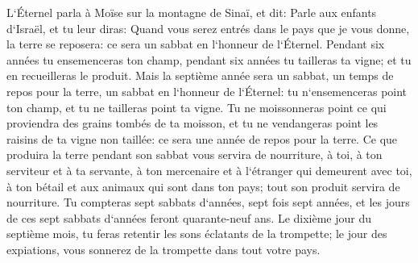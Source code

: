 \verse L`Éternel parla à Moïse sur la montagne de Sinaï, et dit: 
\verse Parle aux enfants d`Israël, et tu leur diras: Quand vous serez entrés dans le pays que je vous donne, la terre se reposera: ce sera un sabbat en l`honneur de l`Éternel. 
\verse Pendant six années tu ensemenceras ton champ, pendant six années tu tailleras ta vigne; et tu en recueilleras le produit. 
\verse Mais la septième année sera un sabbat, un temps de repos pour la terre, un sabbat en l`honneur de l`Éternel: tu n`ensemenceras point ton champ, et tu ne tailleras point ta vigne. 
\verse Tu ne moissonneras point ce qui proviendra des grains tombés de ta moisson, et tu ne vendangeras point les raisins de ta vigne non taillée: ce sera une année de repos pour la terre. 
\verse Ce que produira la terre pendant son sabbat vous servira de nourriture, à toi, à ton serviteur et à ta servante, à ton mercenaire et à l`étranger qui demeurent avec toi, 
\verse à ton bétail et aux animaux qui sont dans ton pays; tout son produit servira de nourriture. 
\verse Tu compteras sept sabbats d`années, sept fois sept années, et les jours de ces sept sabbats d`années feront quarante-neuf ans. 
\verse Le dixième jour du septième mois, tu feras retentir les sons éclatants de la trompette; le jour des expiations, vous sonnerez de la trompette dans tout votre pays. 
